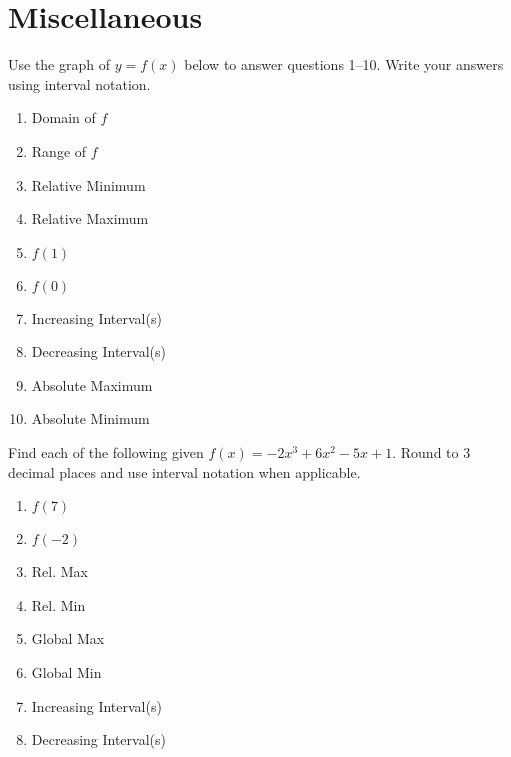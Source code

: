 \section{Miscellaneous}

Use the graph of $y = f(x)$ below to answer questions 1--10. Write your answers using interval notation.
\begin{center}
\end{center}

\begin{multicols}{2}
\begin{enumerate}
\item Domain of $f$
\item Range of $f$
\item Relative Minimum
\item Relative Maximum
\item $f(1)$
\item $f(0)$
\item Increasing Interval(s)
\item Decreasing Interval(s)
\item Absolute Maximum
\item Absolute Minimum
\setcounter{Review}{\value{enumi}}
\end{enumerate}
\end{multicols}

Find each of the following given $f(x) = -2x^{3}+6x^{2}-5x+1$. Round to 3 decimal places and use interval notation when applicable.
\begin{multicols}{2}
\begin{enumerate}
\setcounter{enumi}{\value{Review}}
\item $f(7)$
\item $f(-2)$
\item Rel. Max
\item Rel. Min
\item Global Max
\item Global Min
\item Increasing Interval(s)
\item Decreasing Interval(s)
\setcounter{Review}{\value{enumi}}
\end{enumerate}
\end{multicols}

